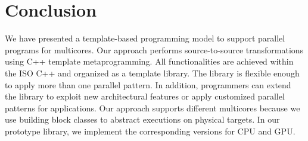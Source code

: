 \section{Conclusion}\label{sec:con}


We have presented a template-based programming model to support parallel
programs for multicores. Our approach performs source-to-source
transformations using C++ template metaprogramming. All functionalities
are achieved within the ISO C++ and organized as a template library. The
library is flexible enough to apply more than one parallel
pattern. In addition, programmers can extend the library to
exploit new architectural
features or apply customized parallel patterns for applications. Our approach
supports different multicores because we use building
block classes to abstract executions on physical targets. In our
prototype library, we implement the corresponding versions for CPU
and GPU.



